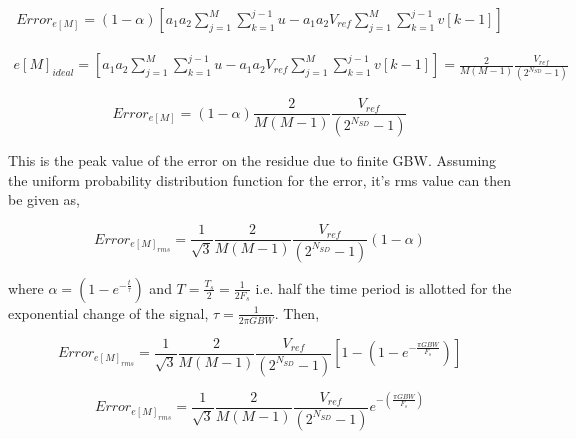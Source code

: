   
 \begin{equation*}
     \begin{split}
         Error_{e[M]} = \left(1-\alpha\right) \left[a_1a_2\sum_{j=1}^{M}\sum_{k=1}^{j-1}u- a_1a_2V_{ref}\sum_{j=1}^{M}\sum_{k=1}^{j-1}v[k-1]\right]
     \end{split}
 \end{equation*}
 
  \begin{align*}
    e[M]_{ideal}=\left[a_1a_2\sum_{j=1}^{M}\sum_{k=1}^{j-1}u-a_1a_2V_{ref}\sum_{j=1}^{M}\sum_{k=1}^{j-1} v[k-1]\right]=\frac{2}{M(M-1)}\frac{V_{ref}}{\left(2^{N_{SD}}-1\right)}
\end{align*}

\begin{equation*}
    Error_{e[M]}=\left(1-\alpha\right) \frac{2}{M(M-1)}\frac{V_{ref}}{\left(2^{N_{SD}}-1\right)}
\end{equation*}


This is the peak value of the error on the residue due to finite GBW. Assuming the uniform probability distribution function for the error, it's rms value can then be given as,

\begin{equation}
    Error_{e[M]_{rms}}=\frac{1}{\sqrt{3}}\frac{2}{M(M-1)}\frac{V_{ref}}{\left(2^{N_{SD}}-1\right)}\left(1-\alpha\right) 
\end{equation}

 where $\alpha = \left(1-e^{-\frac{t}{\tau}}\right)$ and $T=\frac{T_s}{2}=\frac{1}{2F_s}$ i.e. half the time period is allotted for the exponential change of the signal, $\tau = \frac{1}{2\pi GBW}$. Then, 
 
 \begin{equation}
    Error_{e[M]_{rms}}=\frac{1}{\sqrt{3}}\frac{2}{M(M-1)}\frac{V_{ref}}{\left(2^{N_{SD}}-1\right)}\left[1-\left(1-e^{-\frac{\pi GBW}{F_s}}\right)\right]
\end{equation}

 \begin{equation}\label{ERR_RMS_GBW}
    Error_{e[M]_{rms}}=\frac{1}{\sqrt{3}}\frac{2}{M(M-1)}\frac{V_{ref}}{\left(2^{N_{SD}}-1\right)}e^{-\left(\frac{\pi GBW}{F_s}\right)}
\end{equation}



